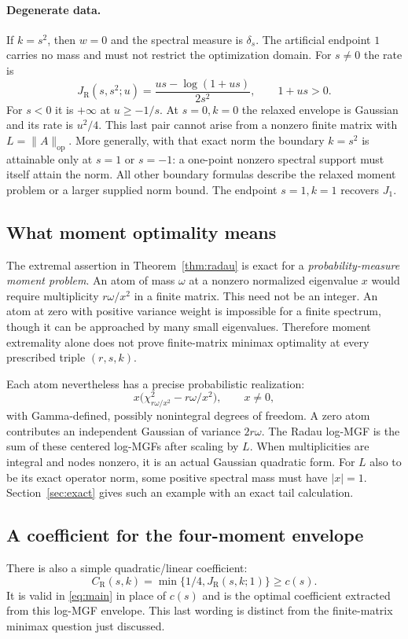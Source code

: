 \documentclass[11pt,letterpaper]{article}
\numberwithin{equation}{section}
\theoremstyle{definition}\newtheorem{definition}[theorem]{Definition}
\theoremstyle{remark}\newtheorem{remark}[theorem]{Remark}
\newcommand{\op}{\mathrm{op}}
\newcommand{\cRad}{C_{\mathrm R}}
\newcommand{\jRad}{J_{\mathrm R}}
\begin{document}
\paragraph{Degenerate data.}
If $k=s^2$, then $w=0$ and the spectral measure is $\delta_s$.
The artificial endpoint $1$ carries no mass and must not restrict
the optimization domain. For $s\ne0$ the rate is
\begin{equation}\label{eq:single}
 \jRad(s,s^2;u)=\frac{us-\log(1+us)}{2s^2},
 \qquad 1+us>0.
\end{equation}
For $s<0$ it is $+\infty$ at $u\ge-1/s$. At $s=0,k=0$ the
relaxed envelope is Gaussian and its rate is $u^2/4$. This last
pair cannot arise from a nonzero finite matrix with $L=\|A\|_{\op}$.
More generally, with that exact norm the boundary $k=s^2$ is attainable
only at $s=1$ or $s=-1$: a one-point nonzero spectral support must
itself attain the norm. All other boundary formulas describe the
relaxed moment problem or a larger supplied norm bound. The endpoint $s=1,k=1$
recovers $J_1$.

\subsection{What moment optimality means}
The extremal assertion in Theorem~\ref{thm:radau} is exact for a
\emph{probability-measure moment problem}. An atom of mass $\omega$
at a nonzero normalized eigenvalue $x$ would require multiplicity
$r\omega/x^2$ in a finite matrix. This need not be an integer.
An atom at zero with positive variance weight is impossible for a
finite spectrum, though it can be approached by many small eigenvalues.
Therefore moment extremality alone does not prove finite-matrix
minimax optimality at every prescribed triple $(r,s,k)$.

Each atom nevertheless has a precise probabilistic realization:
\[
 x\bigl(\chi^2_{r\omega/x^2}-r\omega/x^2\bigr),\qquad x\ne0,
\]
with Gamma-defined, possibly nonintegral degrees of freedom. A zero
atom contributes an independent Gaussian of variance $2r\omega$.
The Radau log-MGF is the sum of these centered log-MGFs after scaling
by $L$. When multiplicities are integral and nodes nonzero, it is
an actual Gaussian quadratic form. For $L$ also to be its exact operator
norm, some positive spectral mass must have $|x|=1$.
Section~\ref{sec:exact} gives such an example with an exact tail calculation.

\subsection{A coefficient for the four-moment envelope}
There is also a simple quadratic/linear coefficient:
\begin{equation}\label{eq:CR}
 \cRad(s,k)=\min\{1/4,\jRad(s,k;1)\}\ge c(s).
\end{equation}
It is valid in \eqref{eq:main} in place of $c(s)$ and is the optimal
coefficient extracted from this log-MGF envelope. This last wording
is distinct from the finite-matrix minimax question just discussed.
\end{document}
